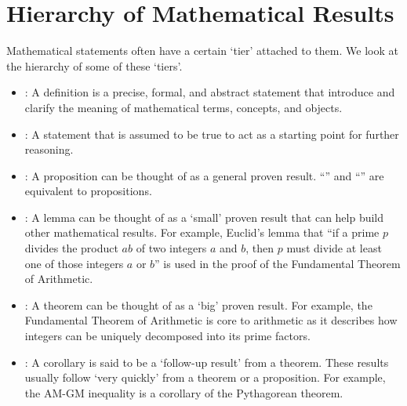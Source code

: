 \section{Hierarchy of Mathematical Results}
Mathematical statements often have a certain `tier' attached to them. We look at the hierarchy of some of these `tiers'.
\begin{itemize}
    \item {}: A definition is a precise, formal, and abstract statement that introduce and clarify the meaning of mathematical terms, concepts, and objects.
    \item {}: A statement that is assumed to be true to act as a starting point for further reasoning.
    \item {}: A proposition can be thought of as a general proven result. ``'' and ``'' are equivalent to propositions.
    \item {}: A lemma can be thought of as a `small' proven result that can help build other mathematical results. For example, Euclid's lemma that ``if a prime $p$ divides the product $ab$ of two integers $a$ and $b$, then $p$ must divide at least one of those integers $a$ or $b$'' is used in the proof of the Fundamental Theorem of Arithmetic.
    \item {}: A theorem can be thought of as a `big' proven result. For example, the Fundamental Theorem of Arithmetic is core to arithmetic as it describes how integers can be uniquely decomposed into its prime factors.
    \item {}: A corollary is said to be a `follow-up result' from a theorem. These results usually follow `very quickly' from a theorem or a proposition. For example, the AM-GM inequality is a corollary of the Pythagorean theorem.
\end{itemize}
